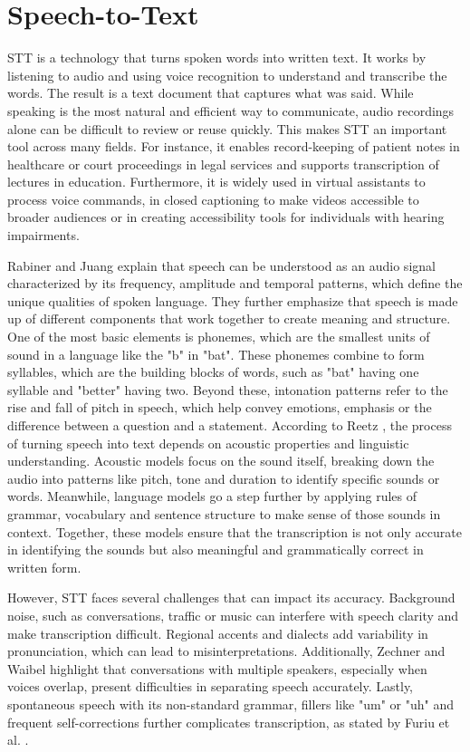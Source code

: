 \section{Speech-to-Text}
\acs{STT} is a technology that turns spoken words into written text. 
It works by listening to audio and using voice recognition to understand and transcribe the words. 
The result is a text document that captures what was said. 
While speaking is the most natural and efficient way to communicate, audio recordings alone can be difficult to review or reuse quickly. 
This makes \acs{STT} an important tool across many fields. 
For instance, it enables record-keeping of patient notes in healthcare or court proceedings in legal services and supports transcription of lectures in education. 
Furthermore, it is widely used in virtual assistants to process voice commands, in closed captioning to make videos accessible to broader audiences or in creating accessibility tools for individuals with hearing impairments.

Rabiner and Juang \cite{rabiner1993speechrecognition} explain that speech can be understood as an audio signal characterized by its frequency, amplitude and temporal patterns, which define the unique qualities of spoken language. 
They further emphasize that speech is made up of different components that work together to create meaning and structure. 
One of the most basic elements is phonemes, which are the smallest units of sound in a language like the "b" in "bat". 
These phonemes combine to form syllables, which are the building blocks of words, such as "bat" having one syllable and "better" having two. 
Beyond these, intonation patterns refer to the rise and fall of pitch in speech, which help convey emotions, emphasis or the difference between a question and a statement. 
According to Reetz \cite{reetz2020phonetics}, the process of turning speech into text depends on acoustic properties and linguistic understanding. 
Acoustic models focus on the sound itself, breaking down the audio into patterns like pitch, tone and duration to identify specific sounds or words. 
Meanwhile, language models go a step further by applying rules of grammar, vocabulary and sentence structure to make sense of those sounds in context. 
Together, these models ensure that the transcription is not only accurate in identifying the sounds but also meaningful and grammatically correct in written form.

However, \acs{STT} faces several challenges that can impact its accuracy. 
Background noise, such as conversations, traffic or music can interfere with speech clarity and make transcription difficult. 
Regional accents and dialects add variability in pronunciation, which can lead to misinterpretations. 
Additionally, Zechner and Waibel \cite{zechner20000spontaeousspeech} highlight that conversations with multiple speakers, especially when voices overlap, present difficulties in separating speech accurately. 
Lastly, spontaneous speech with its non-standard grammar, fillers like "um" or "uh" and frequent self-corrections further complicates transcription, as stated by Furiu et al. \cite{furiu2004spontaneousspeech}. 

